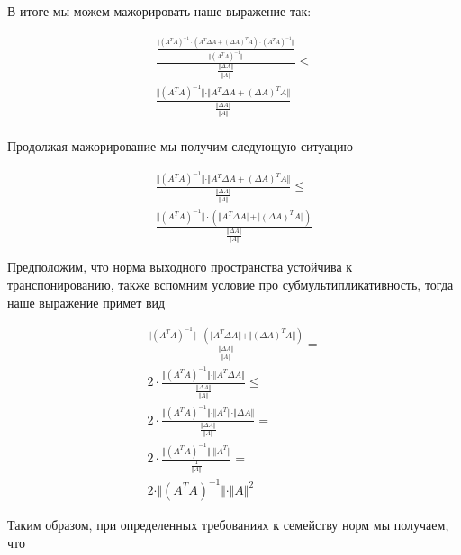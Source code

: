 \documentclass{article}
\begin{document}
    В итоге мы можем мажорировать наше выражение так:

    \[
    \begin{gathered}
        \frac{ \frac{\Vert  (A^{T} A)^{-1} \cdot (A^{T} \Delta A + (\Delta A)^{T} A) \cdot (A^{T} A)^{-1} \Vert }{\Vert (A^T A)^{-1} \Vert} }{ \frac{\Vert \Delta A \Vert}{\Vert A \Vert} } \leq \\
        \frac{ \Vert (A^{T} A)^{-1} \Vert \cdot \Vert A^{T} \Delta A + (\Delta A)^{T} A \Vert }{ \frac{\Vert \Delta A \Vert}{\Vert A \Vert} } \\
    \end{gathered}
    \]

    Продолжая мажорирование мы получим следующую ситуацию

    \[
    \begin{gathered}
        \frac{ \Vert (A^{T} A)^{-1} \Vert \cdot \Vert A^{T} \Delta A + (\Delta A)^{T} A \Vert }{ \frac{\Vert \Delta A \Vert}{\Vert A \Vert} } \leq \\
        \frac{ \Vert (A^{T} A)^{-1} \Vert \cdot ( \Vert A^{T} \Delta A \Vert + \Vert (\Delta A)^{T} A \Vert) }{ \frac{\Vert \Delta A \Vert}{\Vert A \Vert} }
    \end{gathered}
    \]

    Предположим, что норма выходного пространства устойчива к транспонированию, также вспомним условие про субмультипликативность, тогда наше выражение примет вид

    \[
        \begin{gathered}
            \frac{ \Vert (A^{T} A)^{-1} \Vert \cdot ( \Vert A^{T} \Delta A \Vert + \Vert (\Delta A)^{T} A \Vert) }{ \frac{\Vert \Delta A \Vert}{\Vert A \Vert} } = \\
            2 \cdot \frac{ \Vert (A^{T} A)^{-1} \Vert \cdot \Vert A^{T} \Delta A \Vert  }{ \frac{\Vert \Delta A \Vert}{\Vert A \Vert} } \leq \\
            2 \cdot \frac{ \Vert (A^{T} A)^{-1} \Vert \cdot \Vert A^{T} \Vert \cdot \Vert \Delta A \Vert  }{ \frac{\Vert \Delta A \Vert}{\Vert A \Vert} } = \\
            2 \cdot \frac{ \Vert (A^{T} A)^{-1} \Vert \cdot \Vert A^{T} \Vert  }{ \frac{1}{\Vert A \Vert} } = \\
            2 \cdot \Vert (A^{T} A)^{-1} \Vert \cdot \Vert A \Vert^{2}
        \end{gathered}
    \]

    Таким образом, при определенных требованиях к семейству норм мы получаем, что
\end{document}
